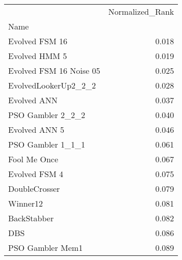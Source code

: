 \begin{tabular}{lr}
\toprule
{} &  Normalized\_Rank \\
Name                    &                  \\
\midrule
Evolved FSM 16          &            0.018 \\
Evolved HMM 5           &            0.019 \\
Evolved FSM 16 Noise 05 &            0.025 \\
EvolvedLookerUp2\_2\_2    &            0.028 \\
Evolved ANN             &            0.037 \\
PSO Gambler 2\_2\_2       &            0.040 \\
Evolved ANN 5           &            0.046 \\
PSO Gambler 1\_1\_1       &            0.061 \\
Fool Me Once            &            0.067 \\
Evolved FSM 4           &            0.075 \\
DoubleCrosser           &            0.079 \\
Winner12                &            0.081 \\
BackStabber             &            0.082 \\
DBS                     &            0.086 \\
PSO Gambler Mem1        &            0.089 \\
\bottomrule
\end{tabular}
